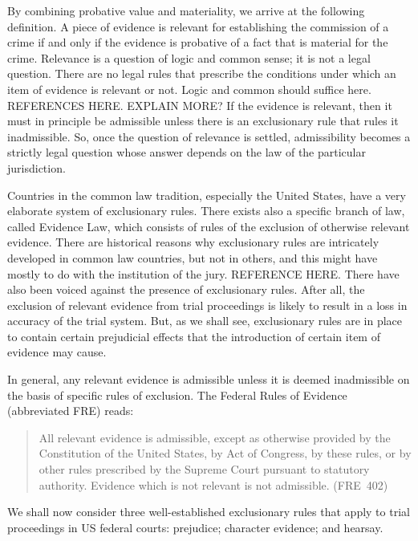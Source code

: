 \documentclass[10pt]{article}
\begin{document}
By combining probative value and materiality, we arrive at the following definition. A piece of evidence is relevant for establishing the commission of a 
crime if and only if the evidence is probative of a fact that is material for the crime. Relevance is a question of logic and common sense; it is not a legal question.  There are no legal rules that prescribe the conditions under which an item of evidence is relevant or not. Logic and common should suffice here. REFERENCES HERE. EXPLAIN MORE?
If the evidence is relevant, then it must in principle be admissible unless there is an exclusionary rule that rules it inadmissible. 
So, once the question of relevance is settled, admissibility becomes a strictly legal question whose answer depends 
on the law of the particular jurisdiction. 


Countries in the common law tradition, especially the United States, have a very elaborate system of exclusionary rules. There exists also a specific branch of law, called Evidence Law, which consists of rules of the exclusion of otherwise relevant evidence. There are historical reasons why exclusionary rules are intricately developed in common law countries, but not in others, and this might have mostly to do with the institution of the jury. REFERENCE HERE. 
There have also been voiced against the presence of exclusionary rules. After all, the exclusion of relevant evidence from trial proceedings is likely to result in a loss in accuracy of the trial system. But, as we shall see, exclusionary rules are in place to contain 
certain prejudicial effects that the introduction of certain item of evidence may cause.


In general, any relevant evidence is admissible 
unless it is deemed inadmissible on the basis of specific rules of exclusion. %
The Federal Rules of Evidence (abbreviated FRE) reads:
%
\begin{quote}
\begin{singlespace}
All relevant evidence is admissible, except as otherwise provided by the Constitution of the United States, by Act of Congress, by these rules, or by other rules prescribed by the Supreme Court pursuant to statutory authority. Evidence which is not relevant is not admissible. (FRE\ 402)
\end{singlespace}
\end{quote}
%

We shall now consider three well-established exclusionary rules 
that apply to trial proceedings in US federal courts: 
prejudice; character evidence; and hearsay. 
\end{document}
